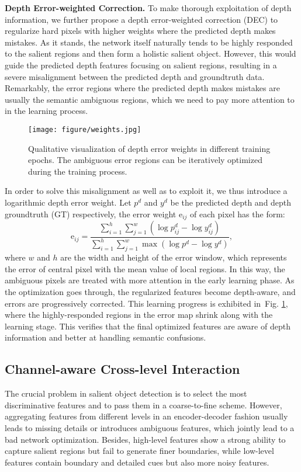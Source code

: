 \documentclass[journal]{IEEEtran}
\newcommand{\figref}[1]{Fig. \ref{#1}}
\newcommand{\br}[1]{\bm{\mathrm{#1}}}
\begin{document}
\textbf{Depth Error-weighted Correction.}
To make thorough exploitation of depth information, we further propose a depth error-weighted correction (DEC) to regularize hard pixels with higher weights where the predicted depth makes mistakes. As it stands, the network itself naturally tends to be highly responded to the salient regions and then form a holistic salient object. However, this would guide the predicted depth features focusing on salient regions, resulting in a severe misalignment between the predicted depth and groundtruth data. Remarkably, the error regions where the predicted depth makes mistakes are usually the semantic ambiguous regions, which we need to pay more attention to in the learning process.

 \begin{figure}[t]
 	\begin{center}
\texttt{[image: figure/weights.jpg]}
 		\caption{Qualitative visualization of depth error weights in different training epochs. The ambiguous error regions can be iteratively optimized during the training process.
 		}\label{fig:weights}
 	\end{center}
 \end{figure}

In order to solve this misalignment as well as to exploit it, we thus introduce a logarithmic depth error weight. Let $p^d$ and $y^d$ be the predicted depth and  depth groundtruth (GT) respectively, the error weight $\br{e}_{ij}$ of each pixel has the form:
\begin{equation} \label{eq:dew}
\br{e}_{ij}=\frac{\sum_{i=1}^{h}\sum_{j=1}^{w}(\log p_{ij}^d-\log y_{ij}^d)}{\sum_{i=1}^{h}\sum_{j=1}^{w} \max(\log p^d-\log y^d)},
\end{equation}
where $w$ and $h$ are the width and height of the error window, which represents the error of central pixel with the mean value of local regions.
In this way, the ambiguous pixels are treated with more attention in the early learning phase. As the optimization goes through, the regularized features become depth-aware, and errors are progressively corrected. This learning progress is exhibited in~\figref{fig:weights}, where the highly-responded regions in the error map shrink along with the learning stage. This verifies that the final optimized features are aware of depth information and better at handling semantic confusions.


\subsection{Channel-aware Cross-level Interaction} \label{sec:CAF}
The crucial problem in salient object detection is to select the most discriminative features and to pass them in a coarse-to-fine scheme. However, aggregating features from different levels in an encoder-decoder fashion usually leads to missing details or introduces ambiguous features, which jointly lead to a bad network optimization. Besides, high-level features show a strong ability to capture salient regions but fail to generate finer boundaries, while low-level features contain boundary and detailed cues but also more noisy features.
\end{document}

